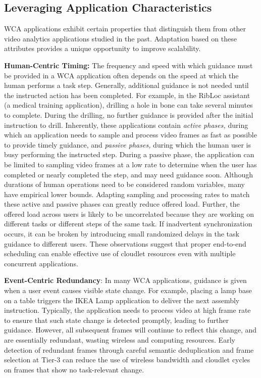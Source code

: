\subsection{Leveraging Application Characteristics}
\label{sec:workload-reduction}

WCA applications exhibit certain properties that distinguish them from
other video analytics applications studied in the past.  Adaptation
based on these attributes provides a unique opportunity to improve
scalability.

\textbf{Human-Centric Timing:} The frequency and speed with which
guidance must be provided in a WCA application often depends on the
speed at which the human performs a task step.  Generally, additional
guidance is not needed until the instructed action has been completed.
For example, in the RibLoc assistant (a medical training application),
drilling a hole in bone can take several minutes to complete.  During
the drilling, no further guidance is provided after the initial
instruction to drill.  Inherently, these applications contain {\em
  active phases,} during which an application needs to sample and
process video frames as fast as possible to provide timely guidance,
and {\em passive phases,} during which the human user is busy
performing the instructed step.  During a passive phase, the
application can be limited to sampling video frames at a low rate to
determine when the user has completed or nearly completed the step,
and may need guidance soon.  Although durations of human operations
need to be considered random variables, many have empirical lower
bounds.  Adapting sampling and processing rates to match these active
and passive phases can greatly reduce offered load.  Further, the
offered load across users is likely to be uncorrelated because they
are working on different tasks or different steps of the same task.
If inadvertent synchronization occurs, it can be broken by introducing
small randomized delays in the task guidance to different users.
These observations suggest that proper end-to-end scheduling can
enable effective use of cloudlet resources even with multiple
concurrent applications.

\textbf{Event-Centric Redundancy}: In many WCA applications, guidance
is given when a user event causes visible state change. For example,
placing a lamp base on a table triggers the IKEA Lamp application to
deliver the next assembly instruction.  Typically, the application
needs to process video at high frame rate to ensure that such state
change is detected promptly, leading to further guidance.  However,
all subsequent frames will continue to reflect this change, and are
essentially redundant, wasting wireless and computing resources.
Early detection of redundant frames through careful semantic
deduplication and frame selection at Tier-3 can reduce the use of
wireless bandwidth and cloudlet cycles on frames that show no
task-relevant change.

